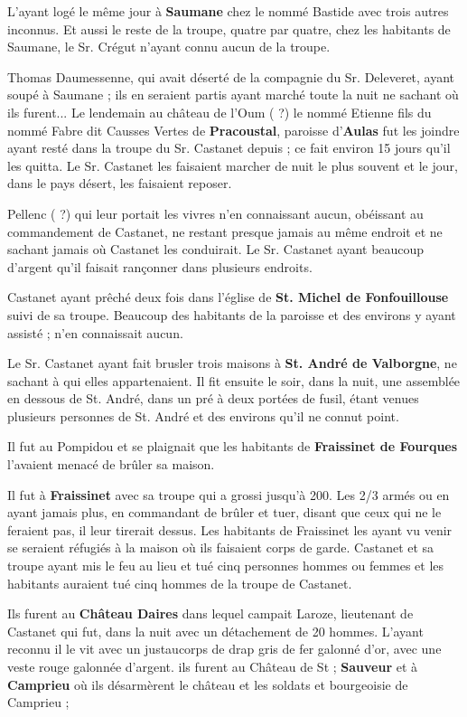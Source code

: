 L’ayant logé le même jour à \textbf{Saumane} chez le nommé Bastide avec trois autres inconnus. Et aussi le reste de la troupe, quatre par quatre, chez les habitants de Saumane, le Sr. Crégut n’ayant connu aucun de la troupe.

Thomas Daumessenne, qui avait déserté de la compagnie du Sr. Deleveret, ayant soupé à Saumane ; ils en seraient partis ayant marché toute la nuit ne sachant où ils furent... Le lendemain au château de l’Oum ( ?) le nommé Etienne fils du nommé Fabre dit Causses Vertes de \textbf{Pracoustal}, paroisse d’\textbf{Aulas} fut les joindre ayant resté dans la troupe du Sr. Castanet depuis ; ce fait environ 15 jours qu’il les quitta. Le Sr. Castanet les faisaient marcher de nuit le plus souvent et le jour, dans le pays désert, les faisaient reposer.

Pellenc ( ?) qui leur portait les vivres n’en connaissant aucun, obéissant au commandement de Castanet, ne restant presque jamais au même endroit et ne sachant jamais où Castanet les conduirait. Le Sr. Castanet ayant beaucoup d’argent qu’il faisait rançonner dans plusieurs endroits.

Castanet ayant prêché deux fois dans l’église de \textbf{St. Michel de Fonfouillouse} suivi de sa troupe. Beaucoup des habitants de la paroisse et des environs y ayant assisté ; n’en connaissait aucun.

Le Sr. Castanet ayant fait brusler trois maisons à \textbf{St. André de Valborgne}, ne sachant à qui elles appartenaient. Il fit ensuite le soir, dans la nuit, une assemblée en dessous de St. André, dans un pré à deux portées de fusil, étant venues plusieurs personnes de St. André et des environs qu’il ne connut point.

Il fut au Pompidou et se plaignait que les habitants de \textbf{Fraissinet de Fourques} l’avaient menacé de brûler sa maison.

Il fut à \textbf{Fraissinet} avec sa troupe qui a grossi jusqu’à 200. Les 2/3 armés ou en ayant jamais plus, en commandant de brûler et tuer, disant que ceux qui ne le feraient pas, il leur tirerait dessus. Les habitants de Fraissinet les ayant vu venir se seraient réfugiés à la maison où ils faisaient corps de garde. Castanet et sa troupe ayant mis le feu au lieu et tué cinq personnes hommes ou femmes et les habitants auraient tué cinq hommes de la troupe de Castanet.

Ils furent au \textbf{Château Daires} dans lequel campait Laroze, lieutenant de Castanet qui fut, dans la nuit avec un détachement de 20 hommes. L’ayant reconnu il le vit avec un justaucorps de drap gris de fer galonné d’or, avec une veste rouge galonnée d’argent. ils furent au Château de St ; \textbf{Sauveur} et à \textbf{Camprieu} où ils désarmèrent le château et les soldats et bourgeoisie de Camprieu ;

